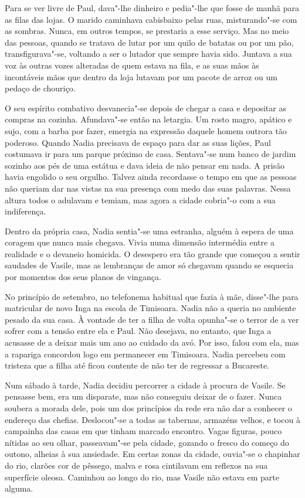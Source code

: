 Para se ver livre de Paul, dava"-lhe dinheiro e pedia"-lhe que fosse de
manhã para as filas das lojas. O marido caminhava cabisbaixo pelas
ruas, misturando"-se com as sombras. Nunca, em outros tempos, se
prestaria a esse serviço. Mas no meio das pessoas, quando se tratava de
lutar por um quilo de batatas ou por um pão, transfigurava"-se, voltando
a ser o lutador que sempre havia sido. Juntava a sua voz às outras vozes
alteradas de quem estava na fila, e as suas mãos às incontáveis mãos que
dentro da loja lutavam por um pacote de arroz ou um pedaço de
chouriço.

O seu espírito combativo desvanecia"-se depois de chegar a
casa e depositar as compras na cozinha. Afundava"-se então na letargia.
Um rosto magro, apático e sujo, com a barba por fazer, emergia na
expressão daquele homem outrora tão poderoso. Quando Nadia precisava de
espaço para dar as suas lições, Paul costumava ir para um parque próximo
de casa. Sentava"-se num banco de jardim sozinho aos pés de uma estátua e
dava ideia de não pensar em nada. A prisão havia engolido o seu orgulho.
Talvez ainda recordasse o tempo em que as pessoas não queriam dar nas
vistas na sua presença com medo das suas palavras. Nessa altura todos o
adulavam e temiam, mas agora a cidade
cobria"-o com a sua indiferença.

Dentro da própria casa, Nadia sentia"-se uma estranha, alguém à espera de
uma coragem que nunca mais chegava. Vivia numa dimensão intermédia entre
a realidade e o devaneio homicida. O desespero era tão grande que começou a sentir saudades de Vasile, mas as lembranças de amor só chegavam
quando se esquecia por momentos dos seus planos de vingança.

No princípio de setembro, no telefonema habitual que fazia à mãe,
disse"-lhe para matricular de novo Inga na escola de Timisoara. Nadia não
a queria no ambiente pesado da sua casa. À vontade de ter a filha de
volta opunha"-se o terror de a ver sofrer com a tensão entre ela e Paul.
Não desejava, no entanto, que Inga a acusasse de a deixar mais um ano ao
cuidado da avó. Por isso, falou com ela, mas a rapariga concordou logo
em permanecer em Timisoara. Nadia percebeu com tristeza que a filha até
ficou contente de não ter de regressar a Bucareste.

Num sábado à tarde, Nadia decidiu percorrer a cidade à procura de
Vasile. Se pensasse bem, era um disparate, mas não conseguiu deixar de o
fazer. Nunca soubera a morada dele, pois um dos princípios da rede era
não dar a conhecer o endereço das chefias. Deslocou"-se a todas as
tabernas, armazéns velhos, e tocou à campainha das casas em que tinham
marcado encontro. Vagas figuras, pouco nítidas ao seu olhar,
passeavam"-se pela cidade, gozando o fresco do começo do outono, alheias
à sua ansiedade. Em certas zonas da cidade, ouvia"-se o chapinhar do rio,
clarões cor de pêssego, malva e rosa cintilavam em reflexos na sua
superfície oleosa. Caminhou ao longo do rio, mas Vasile não estava em
parte alguma.

